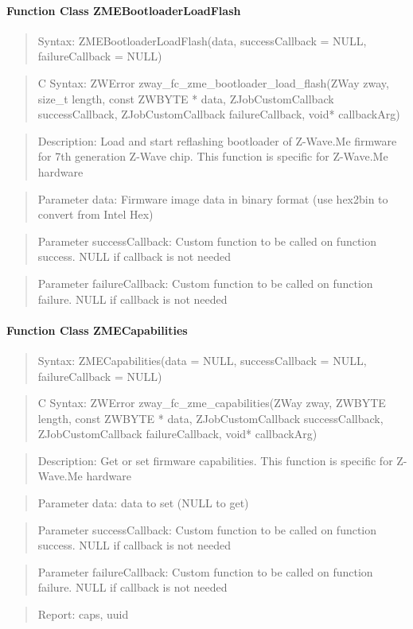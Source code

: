 \paragraph{Function Class ZMEBootloaderLoadFlash}
\begin{quote}Syntax: ZMEBootloaderLoadFlash(data, successCallback = NULL, failureCallback = NULL)\end{quote}
\begin{quote}C Syntax: ZWError zway\_fc\_zme\_bootloader\_load\_flash(ZWay zway, size\_t length, const ZWBYTE * data, ZJobCustomCallback successCallback, ZJobCustomCallback failureCallback, void* callbackArg)\end{quote}
\begin{quote}Description: Load and start reflashing bootloader of Z-Wave.Me firmware for 7th generation Z-Wave chip. This function is specific for Z-Wave.Me hardware\end{quote}
\begin{quote}Parameter data: Firmware image data in binary format (use hex2bin to convert from Intel Hex)\end{quote}
\begin{quote}Parameter successCallback: Custom function to be called on function success. NULL if callback is not needed\end{quote}
\begin{quote}Parameter failureCallback: Custom function to be called on function failure. NULL if callback is not needed\end{quote}


\paragraph{Function Class ZMECapabilities}
\begin{quote}Syntax: ZMECapabilities(data = NULL, successCallback = NULL, failureCallback = NULL)\end{quote}
\begin{quote}C Syntax: ZWError zway\_fc\_zme\_capabilities(ZWay zway, ZWBYTE length, const ZWBYTE * data, ZJobCustomCallback successCallback, ZJobCustomCallback failureCallback, void* callbackArg)\end{quote}
\begin{quote}Description: Get or set firmware capabilities. This function is specific for Z-Wave.Me hardware\end{quote}
\begin{quote}Parameter data: data to set (NULL to get)\end{quote}
\begin{quote}Parameter successCallback: Custom function to be called on function success. NULL if callback is not needed\end{quote}
\begin{quote}Parameter failureCallback: Custom function to be called on function failure. NULL if callback is not needed\end{quote}
\begin{quote}Report: caps, uuid\end{quote}

